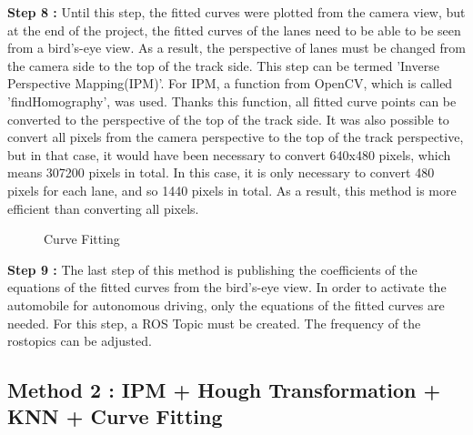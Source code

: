  
\textbf{Step 8 : }Until this step, the fitted curves were plotted from the camera view, but at the end of the project, the fitted curves of the lanes need to be able to be seen from a bird's-eye view. As a result, the perspective of lanes must be changed from the camera side to the top of the track side. This step can be termed 'Inverse Perspective Mapping(IPM)'. For IPM, a function from OpenCV, which is called 'findHomography', was used. Thanks this function, all fitted curve points can be converted to the perspective of the top of the track side. It was also possible to convert all pixels from the camera perspective to the top of the track perspective, but in that case, it would have been necessary to convert 640x480 pixels, which means 307200 pixels in total. In this case, it is only necessary to convert 480 pixels for each lane, and so 1440 pixels in total. As a result, this method is more efficient than converting all pixels.
 	 		 	
\begin{figure}[H]
  \centering
  \caption{Curve Fitting}
\end{figure} 


\textbf{Step 9 : }The last step of this method is publishing the coefficients of the equations of the fitted curves from the bird's-eye view. In order to activate the automobile for autonomous driving, only the equations of the fitted curves are needed. For this step, a ROS Topic must be created. The frequency of the rostopics can be adjusted.

%

\subsection{Method 2 : IPM + Hough Transformation + KNN + Curve Fitting}\label{sec:Case 2}

